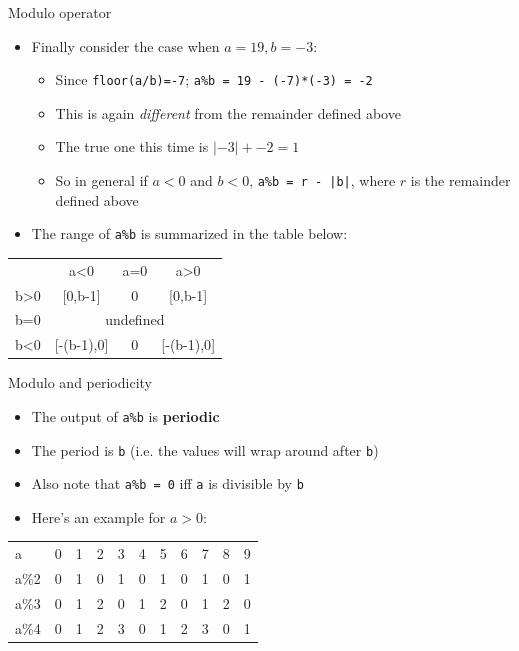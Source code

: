 \documentclass[10pt,xcolor={table,dvipsnames},t]{beamer}
\begin{document}
\begin{frame}{Modulo operator}
  \begin{itemize}
    \item Finally consider the case when $a=19,b=-3$:
    \begin{itemize}
      \item Since \texttt{floor(a/b)=-7}; \texttt{a\%b = 19 - (-7)*(-3) = -2}
      \item This is again \textit{different} from the remainder defined above
      \item The true one this time is $|-3|+-2 = 1$
      \item So in general if $a<0$ and $b<0$, \texttt{a\%b = r - |b|}, where $r$ is the remainder defined above
    \end{itemize}
    \vspace{1mm}
    \item The range of \texttt{a\%b} is summarized in the table below:
  \end{itemize}
  \begin{table}[]
    \begin{tabular}{cccc}
                     & a\textless{}0  & a=0 & a\textgreater{}0 \\
    b\textgreater{}0 & {[}0,b-1{]} & 0   & {[}0,b-1{]}      \\
    b=0              & \multicolumn{3}{c}{undefined}           \\
    b\textless{}0    & {[}-(b-1),0{]} & 0   & {[}-(b-1),0{]}     
    \end{tabular}
    \end{table}
\end{frame}

\begin{frame}{Modulo and periodicity}
  \begin{itemize}
    \item The output of \texttt{a\%b} is \textbf{periodic}
    \item The period is \texttt{b} (i.e. the values will wrap around after \texttt{b})
    \item Also note that \texttt{a\%b = 0} iff \texttt{a} is divisible by \texttt{b}
    \item Here's an example for $a>0$:
  \end{itemize}
  \begin{table}[]
    \begin{tabular}{lllllllllll}
    a    & 0 & 1 & 2 & 3 & 4 & 5 & 6 & 7 & 8 & 9 \\
    a\%2 & 0 & 1 & 0 & 1 & 0 & 1 & 0 & 1 & 0 & 1 \\
    a\%3 & 0 & 1 & 2 & 0 & 1 & 2 & 0 & 1 & 2 & 0 \\
    a\%4 & 0 & 1 & 2 & 3 & 0 & 1 & 2 & 3 & 0 & 1
    \end{tabular}
    \end{table}
\end{frame}
\end{document}
